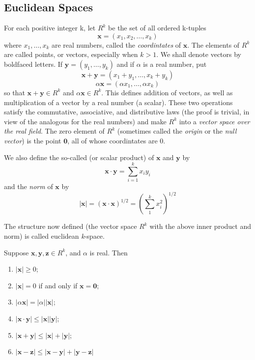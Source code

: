 \documentclass[../poma-note.tex]{subfiles}
\begin{document}
\subsection*{Euclidean Spaces}

\begin{definition}
	For each positive integer k, let $R^k$ be the set of all ordered k-tuples
	\[\mathbf{x}=(x_1,x_2,\dots,x_k)\]
	where $x_1,\dots,x_k$ are real numbers, called the \textit{coordintates} of $\mathbf{x}$. The elements of $R^k$
	are called points, or vectors, especially when $k>1$. We shall denote vectors by boldfaced letters.
	If $\mathbf{y}=(y_1,\dots,y_k)$ and if $\alpha$ is a real number, put
	\[\mathbf{x}+\mathbf{y}=(x_1+y_1,\dots,x_k+y_k)\]
	\[\alpha\mathbf{x}=(\alpha x_1,\dots,\alpha x_k)\]
	so that $\mathbf{x}+\mathbf{y} \in R^k$ and $\alpha\mathbf{x} \in R^k$. This defines addition of vectors,
	as well as multiplication of a vector by a real number (a scalar). These two operations satisfy the commutative,
	associative, and distributive laws (the proof is trivial, in view of the analogous for the real numbers) and
	make $R^k$ into a \textit{vector space over the real field}. The zero element of $R^k$ (sometimes called the
	\textit{origin} or the \textit{null vector}) is the point $\mathbf{0}$, all of whose coordintates are 0.

	We also define the so-called  (or scalar product) of $\mathbf{x}$ and $\mathbf{y}$ by
	\[\mathbf{x}\cdot\mathbf{y}=\sum_{i=1}^{k}x_i y_i\]
	and the \textit{norm} of $\mathbf{x}$ by
	\[|\mathbf{x}| = (\mathbf{x}\cdot\mathbf{x})^{1/2} = \left(\sum_{1}^{k}x^2_i\right)^{1/2}\]

	The structure now defined (the vector space $R^k$ with the above inner product and norm) is called
	euclidean \textit{k}-space.
\end{definition}

\begin{theorem}
	Suppose $\mathbf{x},\mathbf{y},\mathbf{z}\in R^k$, and $\alpha$ is real. Then
	\begin{enumerate}[label=(\alph*)]
		\item $|\mathbf{x}| \ge 0$;
		\item $|\mathbf{x}| = 0$ if and only if $\mathbf{x} = \mathbf{0}$;
		\item $|\alpha\mathbf{x}| = |\alpha||\mathbf{x}|$;
		\item $|\mathbf{x}\cdot\mathbf{y}|\le|\mathbf{x}||\mathbf{y}|$;
		\item $|\mathbf{x}+\mathbf{y}|\le|\mathbf{x}|+|\mathbf{y}|$;
		\item $|\mathbf{x}-\mathbf{z}|\le|\mathbf{x}-\mathbf{y}|+|\mathbf{y}-\mathbf{z}|$
	\end{enumerate}
\end{theorem}
\end{document}
